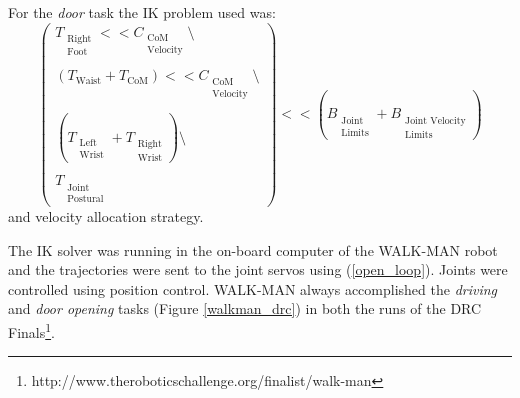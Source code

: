 For the \emph{door} task the IK problem used was:
\begin{equation}
\begin{pmatrix}
T_{\substack{\text{Right}\\\text{Foot}}} << C_{\substack{\text{CoM}\\\text{Velocity}}}\setminus\\ 
\\
\left(T_\text{Waist} + T_\text{CoM}\right)  << C_{\substack{\text{CoM}\\\text{Velocity}}}\setminus\\ 
\\
\left(T_{\substack{\text{Left}\\\text{Wrist}}} + T_{\substack{\text{Right}\\\text{Wrist}}}\right)\setminus\\
\\
T_{\substack{\text{Joint}\\\text{Postural}}}
\end{pmatrix}
<< \left(B_{\substack{\text{Joint}\\\text{Limits}}} + B_{\substack{\text{Joint Velocity}\\\text{Limits}}}\right)
\end{equation}
and velocity allocation strategy.

The IK solver was running in the on-board computer of the WALK-MAN robot and the trajectories were sent to the joint servos using (\ref{open_loop}). Joints were controlled using position control.  WALK-MAN always accomplished the \emph{driving} and \emph{door opening} tasks (Figure \ref{walkman_drc}) in both the runs of the DRC Finals\footnote{http://www.theroboticschallenge.org/finalist/walk-man}.

